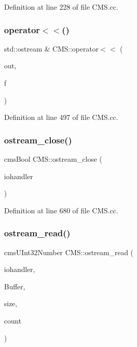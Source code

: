 Definition at line 228 of file C\+M\+S.\+cc.

\mbox{\label{namespace_c_m_s_a0d812bc6465a5fef515e13517dbb14c4}} 
\subsubsection{\texorpdfstring{operator$<$$<$()}{operator<<()}\hspace{0.1cm}{\footnotesize\ttfamily [2/2]}}
{\footnotesize\ttfamily std\+::ostream \& C\+M\+S\+::operator$<$$<$ (\begin{DoxyParamCaption}\item[{std\+::ostream \&}]{out,  }\item[{\hyperlink{class_c_m_s_1_1_format}{Format}}]{f }\end{DoxyParamCaption})}



Definition at line 497 of file C\+M\+S.\+cc.

\mbox{\label{namespace_c_m_s_a57d6234e6fb36cc71bcae4a825ad3ba0}} 
\subsubsection{\texorpdfstring{ostream\+\_\+close()}{ostream\_close()}}
{\footnotesize\ttfamily cms\+Bool C\+M\+S\+::ostream\+\_\+close (\begin{DoxyParamCaption}\item[{cms\+I\+O\+H\+A\+N\+D\+L\+ER $\ast$}]{iohandler }\end{DoxyParamCaption})}



Definition at line 680 of file C\+M\+S.\+cc.

\mbox{\label{namespace_c_m_s_ac7b7b13d2c01af24cbf3fa7587e24c23}} 
\subsubsection{\texorpdfstring{ostream\+\_\+read()}{ostream\_read()}}
{\footnotesize\ttfamily cms\+U\+Int32\+Number C\+M\+S\+::ostream\+\_\+read (\begin{DoxyParamCaption}\item[{cms\+I\+O\+H\+A\+N\+D\+L\+ER $\ast$}]{iohandler,  }\item[{void $\ast$}]{Buffer,  }\item[{cms\+U\+Int32\+Number}]{size,  }\item[{cms\+U\+Int32\+Number}]{count }\end{DoxyParamCaption})}



